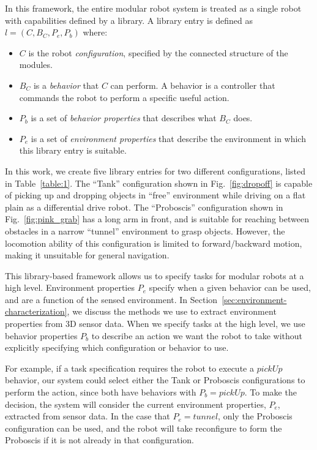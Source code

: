 \documentclass[conference]{IEEEtran}
\begin{document}
In this framework, the entire modular robot system is treated as a single robot with capabilities defined by a library. A library entry is defined as $l = (C,B_C,P_e,P_b)$ where:
\begin{itemize}
\item $C$ is the robot \emph{configuration}, specified by the connected structure of the modules.
\item $B_C$ is a \emph{behavior} that $C$ can perform. A behavior is a controller that commands the robot to perform a specific useful action. 
\item $P_b$ is a set of \emph{behavior properties} that describes what $B_C$ does. 
\item $P_e$ is a set of \emph{environment properties} that describe the environment in which this library entry is suitable. 
\end{itemize} 
%
In this work, we create five library entries for two different configurations,
listed in Table~\ref{table:1}. 
The ``Tank'' configuration shown in Fig.~\ref{fig:dropoff} is capable of picking
up and dropping objects in ``free'' environment while driving on a flat plain as a
differential drive robot.
The ``Proboscis'' configuration shown in Fig.~\ref{fig:pink_grab} has
a long arm in front, and is suitable for reaching between obstacles in a narrow ``tunnel'' environment to grasp objects.
However, the locomotion ability of this configuration is limited to forward/backward
motion, making it unsuitable for general navigation.

This library-based framework allows us to specify tasks for modular robots at a high level. Environment
properties $P_e$ specify when a given behavior can be used, and are a function of
the sensed environment.  In Section~\ref{sec:environment-characterization}, we discuss
the methods we use to extract environment properties from 3D sensor data. When we
specify tasks at the high level, we use behavior properties $P_b$ to describe an
action we want the robot to take without explicitly specifying which configuration
or behavior to use.

For example, if a task specification requires the robot to execute a $pickUp$ behavior, our system could select  either the Tank or Proboscis configurations to perform the action, since both have behaviors with $P_b=pickUp$. To make the decision, the system will consider the current environment properties, $P_e$, extracted from sensor data.  In the case that $P_e=tunnel$, only the Proboscis configuration can be used, and the robot will take  reconfigure to form the Proboscis if it is not already in that configuration.
\end{document}
